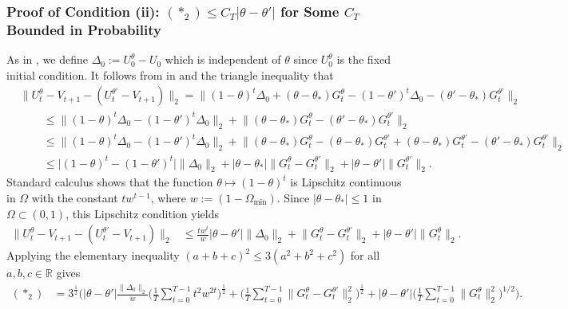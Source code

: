 \documentclass[a4paper, 11pt]{article}
\newcommand{\R}{\mathbb{R}}
\theoremstyle{definition}
\begin{document}
\subsubsection{Proof of Condition (ii): $(*_2) \le C_T | \theta - \theta' |$ for Some $C_T$ Bounded in Probability} \label{apx:stochastic_eqcon_2}

As in , we define $\Delta_0 := U_0^\theta - U_0$ which is independent of $\theta$ since $U_0^\theta$ is the fixed initial condition.
It follows from  in  and the triangle inequality that
\begin{align}
    & \| U_t^{\theta}  - V_{t+1} - ( U_t^{\theta'} - V_{t+1} ) \|_2 = \big\| (1 - \theta)^t \Delta_0 + (\theta - \theta_*) G_t^\theta - (1 - \theta')^t \Delta_0 - (\theta' - \theta_*) G_t^{\theta'} \big\|_2 \\
    & \hspace{25pt} \le \big\| (1 - \theta)^t \Delta_0 - (1 - \theta')^t \Delta_0 \big\|_2 + \big\| (\theta - \theta_*) G_t^\theta - (\theta' - \theta_*) G_t^{\theta'} \big\|_2 \\
    & \hspace{25pt} \le \big\| (1 - \theta)^t \Delta_0 - (1 - \theta')^t \Delta_0 \big\|_2 + \big\| (\theta - \theta_*) G_t^\theta - (\theta - \theta_*) G_t^{\theta'} + (\theta - \theta_*) G_t^{\theta'} - (\theta' - \theta_*) G_t^{\theta'} \big\|_2 \\
    & \hspace{25pt} \le \big| (1 - \theta)^t - (1 - \theta')^t \big| \big\| \Delta_0 \big\|_2 + \big| \theta - \theta_* \big| \big\| G_t^\theta - G_t^{\theta'} \big\|_2 + \big| \theta - \theta' \big| \big\| G_t^{\theta'} \big\|_2 .
\end{align}
Standard calculus shows that the function $\theta \mapsto (1 - \theta)^{t}$ is Lipschitz continuous in $\Omega$ with the constant $t w^{t-1}$, where $w := (1 - \Omega_{\text{min}})$.
Since $| \theta - \theta_* | \le 1$ in $\Omega \subset (0, 1)$, this Lipschitz condition yields
\begin{align}
    \| U_t^{\theta}  - V_{t+1} - ( U_t^{\theta'} - V_{t+1} ) \|_2 & \le \frac{ t w^{t} }{w} \big| \theta - \theta' \big| \big\| \Delta_0 \big\|_2 + \big\| G_t^\theta - G_t^{\theta'} \big\|_2 + \big| \theta - \theta' \big| \big\| G_t^{\theta} \big\|_2 .
\end{align}
Applying the elementary inequality $(a + b + c)^2 \le 3 (a^2 + b^2 + c^2)$ for all $a, b, c \in \R$ gives 
\begin{align}
    (*_2) & = 3^{\frac{1}{2}} \Bigg( \big| \theta - \theta' \big| \frac{ \big\| \Delta_0 \big\|_2 }{ w } \bigg( \frac{1}{T} \sum_{t=0}^{T-1} t^2 w^{2 t} \bigg)^{\frac{1}{2}} + \bigg( \frac{1}{T} \sum_{t=0}^{T-1} \big\| G_t^\theta - G_t^{\theta'} \big\|_2^2 \bigg)^{\frac{1}{2}} + \big| \theta - \theta' \big| \bigg( \frac{1}{T} \sum_{t=0}^{T-1} \big\| G_t^{\theta} \big\|_2^2 \bigg)^{1/2} \Bigg) . 
\end{align}
\end{document}
